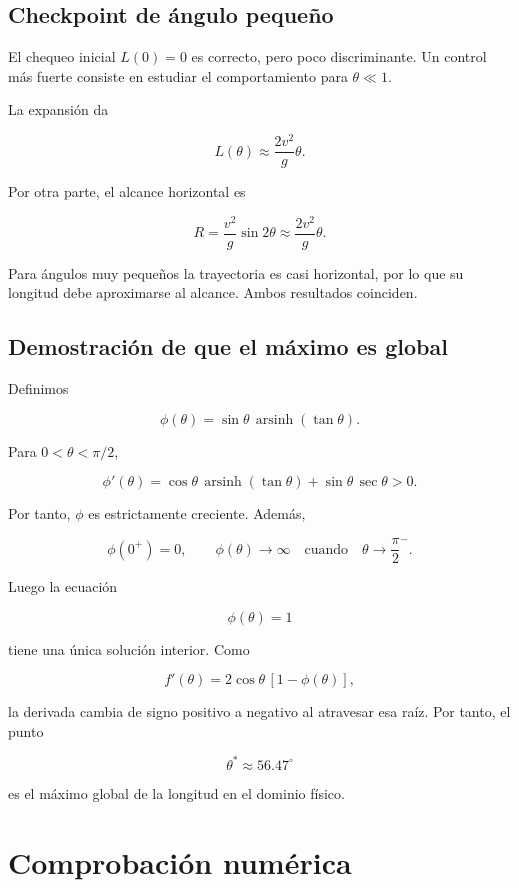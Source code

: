 \subsection{Checkpoint de ángulo pequeño}

El chequeo inicial \(L(0)=0\) es correcto, pero poco discriminante. Un control más fuerte consiste en estudiar el comportamiento para \(\theta\ll1\).

La expansión da

\[
L(\theta)
\approx
\frac{2v^2}{g}\theta.
\]

Por otra parte, el alcance horizontal es

\[
R=\frac{v^2}{g}\sin 2\theta
\approx
\frac{2v^2}{g}\theta.
\]

Para ángulos muy pequeños la trayectoria es casi horizontal, por lo que su longitud debe aproximarse al alcance. Ambos resultados coinciden.

\subsection{Demostración de que el máximo es global}

Definimos

\[
\phi(\theta)
=
\sin\theta\,\operatorname{arsinh}(\tan\theta).
\]

Para \(0<\theta<\pi/2\),

\[
\phi'(\theta)
=
\cos\theta\,\operatorname{arsinh}(\tan\theta)
+
\sin\theta\,\sec\theta
>0.
\]

Por tanto, \(\phi\) es estrictamente creciente. Además,

\[
\phi(0^+)=0,
\qquad
\phi(\theta)\to\infty
\quad\text{cuando}\quad
\theta\to\frac{\pi}{2}^{-}.
\]

Luego la ecuación

\[
\phi(\theta)=1
\]

tiene una única solución interior. Como

\[
f'(\theta)
=
2\cos\theta\,[1-\phi(\theta)],
\]

la derivada cambia de signo positivo a negativo al atravesar esa raíz. Por tanto, el punto

\[
\boxed{\theta^*\approx56.47^\circ}
\]

es el máximo global de la longitud en el dominio físico.

\section{Comprobación numérica}

